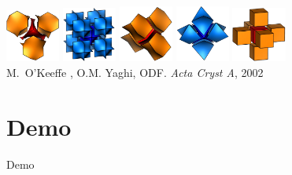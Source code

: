 \documentclass{beamer}
\begin{document}
\begin{frame}
\begin{center}
    \includegraphics[width=0.7in]{Y-star}
    \hspace{1mm}
    \includegraphics[width=0.7in]{NbO}
    \hspace{1mm}
    \includegraphics[width=0.7in]{Diamond}
    \hspace{1mm}
    \includegraphics[width=0.7in]{BodyCenteredCubic}
    \hspace{1mm}
    \includegraphics[width=0.7in]{PrimitiveCubic}\\[0.5in]

    {\small
      M.\ O'Keeffe , O.M. Yaghi, ODF. {\it Acta Cryst A}, 2002
    }
  \end{center}
\end{frame}


\section{Demo}

\begin{frame}
  \begin{center}
    Demo
  \end{center}
\end{frame}
\end{document}
